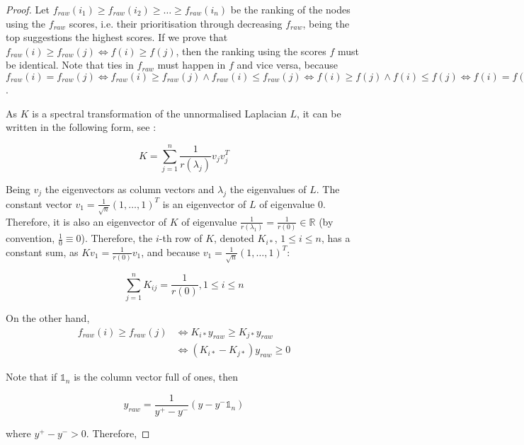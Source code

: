 \documentclass[12pt]{article}  %
\begin{document}
\begin{proof}

Let $f_{raw}({i_1}) \geq f_{raw}({i_2}) \geq \ldots \geq f_{raw}({i_n}) $ be the ranking of the nodes using the $f_{raw}$ scores, i.e. their prioritisation through decreasing $f_{raw}$, being the top suggestions the highest scores. 
If we prove that $f_{raw}(i) \geq f_{raw}(j) \Leftrightarrow f(i) \geq f(j)$, then the ranking using the scores $f$ must be identical.
Note that ties in $f_{raw}$ must happen in $f$ and vice versa, because $f_{raw}(i) = f_{raw}(j) \Leftrightarrow f_{raw}(i) \geq f_{raw}(j) \wedge f_{raw}(i) \leq f_{raw}(j) \Leftrightarrow f(i) \geq f(j) \wedge f(i) \leq f(j) \Leftrightarrow f(i) = f(j) $.

As $K$ is a spectral transformation of the unnormalised Laplacian $L$, it can be written in the following form, see \cite{smola2003kernels}: 

$$K = \sum_{j = 1}^n \frac{1}{r(\lambda_j)} v_jv_j^T$$

Being $v_j$ the eigenvectors as column vectors and $\lambda_j$ the eigenvalues of $L$. 
The constant vector $v_1 = \frac{1}{\sqrt{n}}\left(1, \ldots, 1\right)^T $ is an eigenvector of $L$ of eigenvalue $0$. 
Therefore, it is also an eigenvector of $K$ of eigenvalue $\frac{1}{r(\lambda_1)} = \frac{1}{r(0)} \in \mathds{R}$ (by convention, $\frac{1}{0} \equiv 0$). 
Therefore, the $i$-th row of $K$, denoted $K_{i*}$, $1 \leq i \leq n$, has a constant sum, as $K v_1 = \frac{1}{r(0)} v_1$, and because $v_1 = \frac{1}{\sqrt{n}}\left(1, \ldots, 1\right)^T $:

$$\sum_{j = 1}^n K_{ij} = \frac{1}{r(0)}, 1 \leq i \leq n$$

On the other hand, 
\begin{equation*}
\begin{split}
f_{raw}(i) \geq f_{raw}(j) &\Leftrightarrow K_{i*} y_{raw} \geq K_{j*} y_{raw} \\
&\Leftrightarrow (K_{i*} - K_{j*}) y_{raw} \geq 0
\end{split}
\end{equation*}

Note that if $\mathbb{1}_n$ is the column vector full of ones, then 

$$ y_{raw} = \frac{1}{y^{+} - y^{-}}(y - y^{-} \mathbb{1}_n)$$

where $y^{+} - y^{-} > 0$.
Therefore, 


\end{proof}
\end{document}
